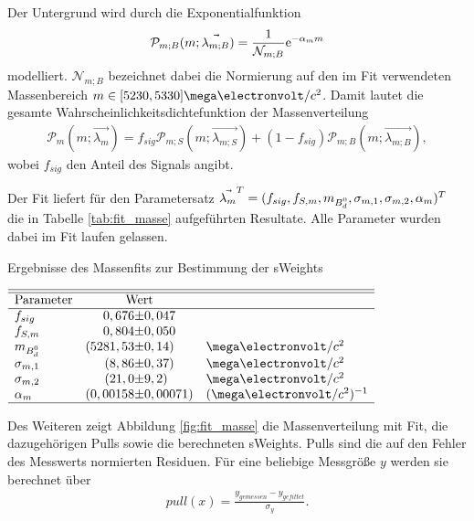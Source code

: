 Der Untergrund wird durch die Exponentialfunktion
\begin{align}
\mathcal{P}_{m;B}(m;\vec{\lambda_{m;B}}) = \frac{1}{\mathcal{N}_{m;B}}\mathrm{e}^{-\alpha_m m}
\end{align}
modelliert. $\mathcal{N}_{m;B}$ bezeichnet dabei die Normierung auf den im Fit verwendeten Massenbereich $m \in [5230,5330]\mega\electronvolt/c^2$. Damit lautet die gesamte Wahrscheinlichkeitsdichtefunktion der Massenverteilung
\begin{align}
\mathcal{P}_{m}(m;\vec{\lambda_{m}}) = f_{sig}\mathcal{P}_{m;S}(m;\vec{\lambda_{m;S}}) + (1-f_{sig})\mathcal{P}_{m;B}(m;\vec{\lambda_{m;B}}) \label{eq:pdf_masse},
\end{align}
wobei $f_{sig}$ den Anteil des Signals angibt.

Der Fit liefert für den Parametersatz $\vec{\lambda_{m}}^T = (f_{sig}, f_{S,m}, m_{\text{$B_d^0$}}, \sigma_{m,1},\sigma_{m,2}, \alpha_m)^T$ die in Tabelle \ref{tab:fit_masse} aufgeführten Resultate. Alle Parameter wurden dabei im Fit laufen gelassen. 

\begin{table}[hptb]
\centering
\caption{Ergebnisse des Massenfits zur Bestimmung der sWeights}
\label{tab:fit_masse}
$\begin{array}{lr@{\pm}ll}
\hline \hline
\text{Parameter} & \multicolumn{2}{c}{\text{Wert}} & \\ \hline
f_{sig}   & 0,676 & 0,047 &\\
f_{S,m}   & 0,804 & 0,050 &\\
m_{\text{\Bd}} & (5281,53 & 0,14)& \mega\electronvolt/c^2 \\
\sigma_{m,1} & (8,86 & 0,37)& \mega\electronvolt/c^2 \\
\sigma_{m,2} & (21,0 & 9,2) &\mega\electronvolt/c^2 \\
\alpha_m & (0,00158 & 0,00071) &(\mega\electronvolt/c^2)^{-1} \\ \hline
\end{array}$
\end{table}

Des Weiteren zeigt Abbildung \ref{fig:fit_masse} die Massenverteilung mit Fit, die dazugehörigen Pulls sowie die berechneten sWeights. Pulls sind die auf den Fehler des Messwerts normierten Residuen. Für eine beliebige Messgröße $y$ werden sie berechnet über
\begin{align}
pull(x) = \frac{y_{gemessen}-y_{gefittet}}{\sigma_y}.
\end{align}

